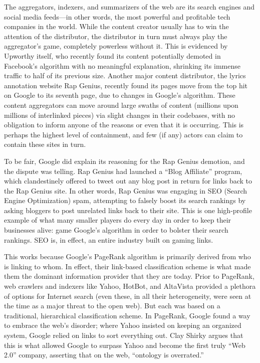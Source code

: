 The aggregators, indexers, and summarizers of the web are its search engines and social media feeds—in other words, the most powerful and profitable tech companies in the world. While the content creator usually has to win the attention of the distributor, the distributor in turn must always play the aggregator's game, completely powerless without it. This is evidenced by Upworthy itself, who recently found its content potentially demoted in Facebook's algorithm with no meaningful explanation, shrinking its immense traffic to half of its previous size.  Another major content distributor, the lyrics annotation website Rap Genius, recently found its pages move from the top hit on Google to its seventh page, due to changes in Google's algorithm.  These content aggregators can move around large swaths of content (millions upon millions of interlinked pieces) via slight changes in their codebases, with no obligation to inform anyone of the reasons or even that it is occurring. This is perhaps the highest level of containment, and few (if any) actors can claim to contain these sites in turn.

To be fair, Google did explain its reasoning for the Rap Genius demotion, and the dispute was telling. Rap Genius had launched a ``Blog Affiliate'' program, which clandestinely offered to tweet out any blog post in return for links back to the Rap Genius site. In other words, Rap Genius was engaging in SEO (Search Engine Optimization) spam, attempting to falsely boost its search rankings by asking bloggers to post unrelated links back to their site. This is one high-profile example of what many smaller players do every day in order to keep their businesses alive: game Google's algorithm in order to bolster their search rankings. SEO is, in effect, an entire industry built on gaming links.

This works because Google's PageRank algorithm is primarily derived from who is linking to whom. In effect, their link-based classification scheme is what made them the dominant information provider that they are today. Prior to PageRank, web crawlers and indexers like Yahoo, HotBot, and AltaVista provided a plethora of options for Internet search (even these, in all their heterogeneity, were seen at the time as a major threat to the open web). But each was based on a traditional, hierarchical classification scheme. In PageRank, Google found a way to embrace the web's disorder; where Yahoo insisted on keeping an organized system, Google relied on links to sort everything out. Clay Shirky argues that this is what allowed Google to surpass Yahoo and become the first truly ``Web 2.0'' company, asserting that on the web, ``ontology is overrated.'' 

